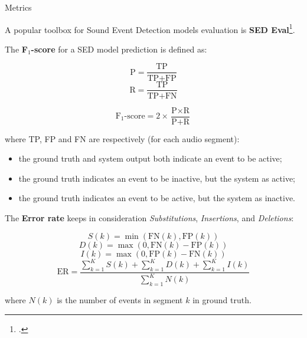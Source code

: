 	\begin{frame}[allowframebreaks]{Metrics}
	
		A popular toolbox for Sound Event Detection models evaluation is \textbf{SED Eval}\footcite{app6060162}.
		
		The \textbf{F$_{1}$-score} for a SED model prediction is defined as:
		\vspace{-3em}
		\begin{multicols}{2}
  			\begin{equation*}
    			\text{P} = \frac{\text{TP}}{\text{TP} + \text{FP}}
  			\end{equation*}\break
  			\begin{equation*}
    			\text{R} = \frac{\text{TP}}{\text{TP} + \text{FN}}
  			\end{equation*}
		\end{multicols}
		\vspace{-1em}
		\begin{equation*}
			\text{F$_{1}$-score} = 2 \times \frac{\text{P} \times \text{R}}{\text{P} + \text{R}}
		\end{equation*}
		
		where TP, FP and FN are respectively (for each audio segment):
		\begin{itemize}
			\item the ground truth and system output both indicate an event to be active;
			\item the ground truth indicates an event to be inactive, but the system as active;
			\item the ground truth indicates an event to be active, but the system as inactive.
		\end{itemize}
		
		\framebreak
		
		The \textbf{Error rate} keeps in consideration \textit{Substitutions}, \textit{Insertions}, and \textit{Deletions}:\vspace{-2em}
		
		\begin{multicols}{2}		
  			\begin{equation*}
    			S(k)=\min(\text{FN}(k),\text{FP}(k))
  			\end{equation*}
  			\begin{equation*}
    			D(k)=\max(0,\text{FN}(k)-\text{FP}(k))
  			\end{equation*}
  			\begin{equation*}
    			I(k)=\max(0,\text{FP}(k)-\text{FN}(k))
  			\end{equation*}
			\break
  			\begin{equation*}
    			\text{ER}=\frac{\sum_{k=1}^{K}S(k)+\sum_{k=1}^{K}D(k)+\sum_{k=1}^{K}I(k)}{\sum_{k=1}^{K}N(k)}
  			\end{equation*}
		\end{multicols}
		
		where $N(k)$ is the number of events in segment $k$ in ground truth.

	\end{frame}
	
